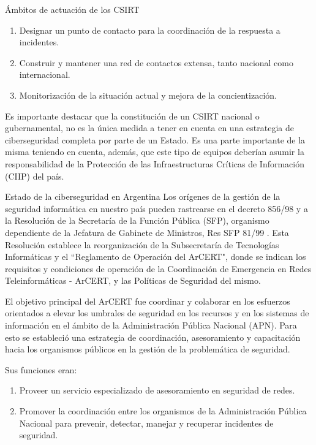 \begin{section}{Ámbitos de actuación de los CSIRT}
\begin{itemize}
            \begin{enumerate}
                \item Designar un punto de contacto para la coordinación de la respuesta a incidentes.
                \item Construir y mantener una red de contactos extensa, tanto nacional como internacional.
                \item Monitorización de la situación actual y mejora de la concientización.
            \end{enumerate}
            Es importante destacar que la constitución de un CSIRT nacional o gubernamental, no es la única medida a tener en cuenta en una estrategia de ciberseguridad completa por parte de un Estado. Es una parte importante de la misma teniendo en cuenta, además, que este tipo de equipos deberían asumir la responsabilidad de la Protección de las Infraestructuras Críticas de Información (CIIP) del país.
        \end{itemize}
        \begin{subsection}{Estado de la ciberseguridad en Argentina} 
        Los orígenes de la gestión de la seguridad informática en nuestro país pueden rastrearse en el decreto 856/98 \cite{jef_gab_856_98} y a la Resolución de la Secretaría de la Función Pública (SFP), organismo dependiente de la Jefatura de Gabinete de Ministros, Res SFP 81/99 \cite{sub_tec}. Esta Resolución establece la reorganización de la Subsecretaría de Tecnologías Informáticas y el “Reglamento de Operación del ArCERT", donde se indican los requisitos y condiciones de operación de la Coordinación de Emergencia en Redes Teleinformáticas - ArCERT, y las Políticas de Seguridad del mismo. \par
        El objetivo principal del ArCERT fue coordinar y colaborar en los esfuerzos orientados a elevar los umbrales de seguridad en los recursos y en los sistemas de información en el ámbito de la Administración Pública Nacional (APN). Para esto se estableció una estrategia de coordinación, asesoramiento y capacitación hacia los organismos públicos en la gestión de la problemática de seguridad. \par
        Sus funciones \cite{sub_tec} eran: 
        \begin{enumerate}
            \item Proveer un servicio especializado de asesoramiento en seguridad de redes.
            \item Promover la coordinación entre los organismos de la Administración Pública Nacional para prevenir, detectar, manejar y recuperar incidentes de seguridad.

\end{enumerate}
\end{subsection}
\end{section}
